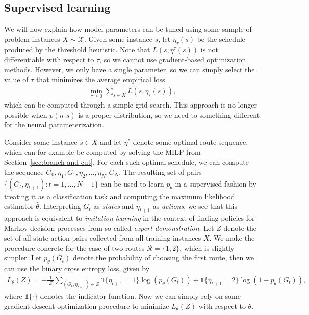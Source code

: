 \documentclass[a4paper]{article}
\theoremstyle{definition}
\theoremstyle{plain}
\begin{document}
\subsection{Supervised learning}

We will now explain how model parameters can be tuned using some sample of
problem instances $X \sim \mathcal{X}$.
%
Given some instance $s$, let $\eta_{\tau}(s)$ be the schedule produced by the
threshold heuristic. Note that $L(s, \eta^{\tau}(s))$ is not differentiable with
respect to $\tau$, so we cannot use gradient-based optimization methods.
However, we only have a single parameter, so we can simply select the value of
$\tau$ that minimizes the average empirical loss
%
\begin{align*}
  \min_{\tau \geq 0} \sum_{s \in X} L(s, \eta_{\tau}(s)) ,
\end{align*}
%
which can be computed through a simple grid search.
%
This approach is no longer possible when $p(\eta \, | s)$ is a proper distribution,
so we need to something different for the neural parameterization.

Consider some instance $s \in X$ and let $\eta^{*}$ denote some optimal route
sequence, which can for example be computed by solving the MILP from
Section~\ref{sec:branch-and-cut}. For each such optimal schedule, we can compute
the sequence $G_{0}, \eta_{1}, G_{1}, \eta_{2}, \dots, \eta_{N}, G_{N}$. The
resulting set of pairs $\{ (G_{t}, \eta_{t+1}) : t = 1, \dots, N - 1 \}$ can be used to
learn $p_{\theta}$ in a supervised fashion by treating it as a classification task
and computing the maximum likelihood estimator $\hat{\theta}$. Interpreting $G_{t}$
as \textit{states} and $\eta_{t+1}$ as \textit{actions}, we see that this
approach is equivalent to \textit{imitation learning} in the context of finding
policies for Markov decision processes from so-called \textit{expert
  demonstration}.
%
Let $Z$ denote the set of all state-action pairs collected from all
training instances $X$. We make the procedure concrete for the case of two
routes $\mathcal{R} = \{ 1, 2 \}$, which is slightly simpler. Let $p_{\theta}(G_{t})$
denote the probability of choosing the first route, then we can use the binary
cross entropy loss, given by
\begin{align*}
  L_{\theta}(Z) = - \frac{1}{|Z|} \sum_{(G_{t}, \eta_{t+1}) \in Z} \mathds{1}\{\eta_{t+1} = 1\} \log(p_{\theta}(G_{t})) + \mathds{1}\{\eta_{t+1} = 2\} \log(1 - p_{\theta}(G_{t})) ,
\end{align*}
where $\mathds{1}\{\cdot\}$ denotes the indicator function. Now we can simply rely on
some gradient-descent optimization procedure to minimize $L_{\theta}(Z)$ with
respect to $\theta$.
\end{document}
